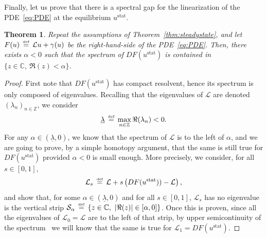 \documentclass[10pt,a4paper]{article}
\theoremstyle{plain}
\newtheorem{theorem}{Theorem}[section]
\newcommand{\ZZ}{\mathbb Z}
\newcommand{\CC}{\mathbb C}
\renewcommand{\L}{\mathcal{L}}
\renewcommand{\S}{\mathcal{S}}
\newcommand{\ul}{\underline{\lambda}}
\newcommand{\1}{\mathbf{1}}
\newcommand{\stat}{\mathrm{stat}}
\newcommand{\bydef}{\,\stackrel{\mbox{\tiny\textnormal{\raisebox{0ex}[0ex][0ex]{def}}}}{=}\,}
\begin{document}
Finally, let us prove that there is a spectral gap for the linearization of the PDE~\eqref{eq:PDE} at the equilibrium $u^\stat$.
\begin{theorem}
Repeat the assumptions of Theorem~\ref{thm:steadystate}, and let $F(u)\bydef \L u +\gamma(u)$ be the right-hand-side of the PDE~\eqref{eq:PDE}. Then, there exists $\alpha<0$ such that the spectrum of  $DF(u^\stat)$ is contained in $\{z\in\CC,\ \Re(z) < \alpha\}$.
\end{theorem}
%
\begin{proof}
First note that $DF(u^\stat)$ has compact resolvent, hence its spectrum is only composed of eigenvalues. Recalling that the eigenvalues of $\L$ are denoted $\left(\lambda_n\right)_{n\in\ZZ}$, we consider 
\begin{align*}
\ul\bydef \max_{n\in\ZZ} \Re(\lambda_n)<0.
\end{align*}
For any $\alpha\in(\ul,0)$, we know that the spectrum of $\L$ is to the left of $\alpha$, and we are going to prove, by a simple homotopy argument, that the same is still true for $DF(u^\stat)$ provided $\alpha<0$ is small enough. More precisely, we consider, for all $s\in[0,1]$,
\begin{align*}
\L_s \bydef \L + s \left(DF(u^\stat)) - \L \right),
\end{align*}
and show that, for some $\alpha\in(\ul,0)$ and for all $s\in[0,1]$, $\L_s$ has no eigenvalue is the vertical strip $\S_\alpha \bydef \{z\in\CC,\ \vert \Re(z)\vert \in[\alpha,0]\}$. Once this is proven, since all the eigenvalues of $\L_0 = \L$ are to the left of that strip, by upper semicontinuity of the spectrum~\cite[IV.3, Theorem 3.16]{Kat13} we will know that the same is true for $\L_1 = DF(u^\stat)$.


\end{proof}
\end{document}
